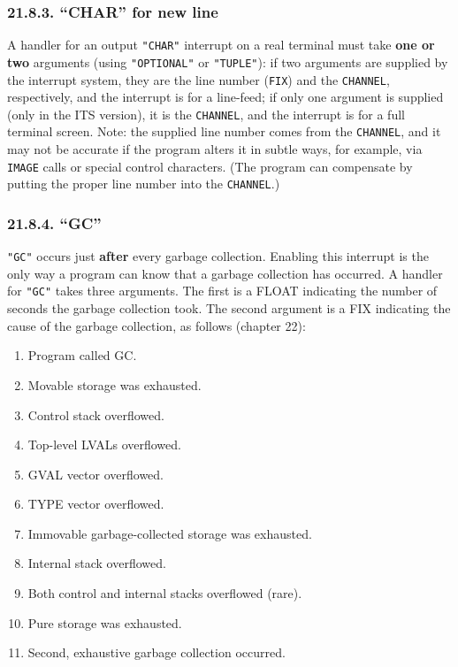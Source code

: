 \documentclass[a4paper,]{article}
\providecommand{\tightlist}{%
  \setlength{\itemsep}{0pt}\setlength{\parskip}{0pt}}
\begin{document}
\subsubsection{\texorpdfstring{21.8.3. ``CHAR'' for new line}{21.8.3. CHAR for new line}}\label{char-for-new-line}

A handler for an output \texttt{"CHAR"} interrupt on a real terminal must take \textbf{one or two} arguments (using
\texttt{"OPTIONAL"} or \texttt{"TUPLE"}): if two arguments are supplied by the interrupt system, they are the line number
(\texttt{FIX}) and the \texttt{CHANNEL}, respectively, and the interrupt is for a line-feed; if only one argument is
supplied (only in the ITS version), it is the \texttt{CHANNEL}, and the interrupt is for a full terminal screen. Note: the
supplied line number comes from the \texttt{CHANNEL}, and it may not be accurate if the program alters it in subtle ways,
for example, via \texttt{IMAGE} calls or special control characters. (The program can compensate by
putting the proper line number into the \texttt{CHANNEL}.)

\subsubsection{\texorpdfstring{21.8.4. ``GC''}{21.8.4. GC}}\label{gc}

\texttt{"GC"}  occurs just \textbf{after} every garbage collection. Enabling this interrupt
is the only way a program can know that a garbage collection has occurred. A handler for \texttt{"GC"} takes three
arguments. The first is a FLOAT indicating the number of seconds the garbage collection took. The second argument is a FIX
indicating the cause of the garbage collection, as follows (chapter 22):

\begin{enumerate}
\def\labelenumi{\arabic{enumi}.}
\setcounter{enumi}{-1}
\tightlist
\item
  Program called GC.
\item
  Movable storage was exhausted.
\item
  Control stack overflowed.
\item
  Top-level LVALs overflowed.
\item
  GVAL vector overflowed.
\item
  TYPE vector overflowed.
\item
  Immovable garbage-collected storage was exhausted.
\item
  Internal stack overflowed.
\item
  Both control and internal stacks overflowed (rare).
\item
  Pure storage was exhausted.
\item
  Second, exhaustive garbage collection occurred.
\end{enumerate}
\end{document}
